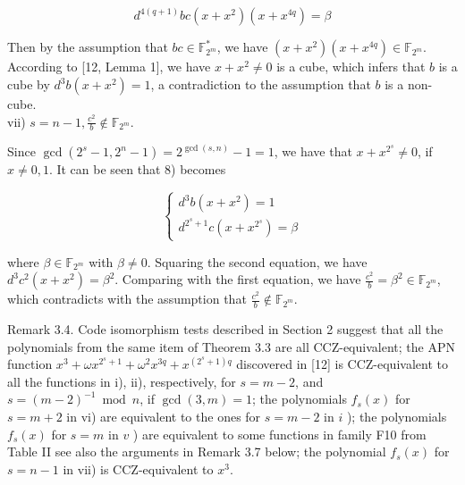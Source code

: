 \documentclass[10pt]{article}
\begin{document}
$$
d^{4(q+1)} b c\left(x+x^{2}\right)\left(x+x^{4 q}\right)=\beta
$$

Then by the assumption that $b c \in \mathbb{F}_{2^{m}}^{*}$, we have $\left(x+x^{2}\right)\left(x+x^{4 q}\right) \in \mathbb{F}_{2^{m}}$. According to [12, Lemma 1], we have $x+x^{2} \neq 0$ is a cube, which infers that $b$ is a cube by $d^{3} b\left(x+x^{2}\right)=1$, a contradiction to the assumption that $b$ is a non-cube.\\
vii) $s=n-1, \frac{c^{2}}{b} \notin \mathbb{F}_{2^{m}}$.

Since $\operatorname{gcd}\left(2^{s}-1,2^{n}-1\right)=2^{\operatorname{gcd}(s, n)}-1=1$, we have that $x+x^{2^{s}} \neq 0$, if $x \neq 0,1$. It can be seen that 8) becomes

$$
\left\{\begin{array}{l}
d^{3} b\left(x+x^{2}\right)=1 \\
d^{2^{s}+1} c\left(x+x^{2^{s}}\right)=\beta
\end{array}\right.
$$

where $\beta \in \mathbb{F}_{2^{m}}$ with $\beta \neq 0$. Squaring the second equation, we have $d^{3} c^{2}\left(x+x^{2}\right)=\beta^{2}$. Comparing with the first equation, we have $\frac{c^{2}}{b}=\beta^{2} \in \mathbb{F}_{2^{m}}$, which contradicts with the assumption that $\frac{c^{2}}{b} \notin \mathbb{F}_{2^{m}}$.

Remark 3.4. Code isomorphism tests described in Section 2 suggest that all the polynomials from the same item of Theorem 3.3 are all CCZ-equivalent; the APN function $x^{3}+\omega x^{2^{s}+1}+\omega^{2} x^{3 q}+x^{\left(2^{s}+1\right) q}$ discovered in [12] is CCZ-equivalent to all the functions in i), ii), respectively, for $s=m-2$, and $s=(m-2)^{-1} \bmod n$, if $\operatorname{gcd}(3, m)=1$; the polynomials $f_{s}(x)$ for $s=m+2$ in vi) are equivalent to the ones for $s=m-2$ in $i$ ); the polynomials $f_{s}(x)$ for $s=m$ in $v$ ) are equivalent to some functions in family F10 from Table II see also the arguments in Remark 3.7 below; the polynomial $f_{s}(x)$ for $s=n-1$ in vii) is CCZ-equivalent to $x^{3}$.
\end{document}

